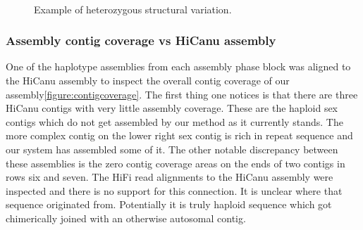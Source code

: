 {\begin{figure}[htbp!]
\caption{Example of heterozygous structural variation.}
\label{figure:assemblyplot}
\begin{centering}
 \\
\end{centering}
\end{figure}

\subsubsection{Assembly contig coverage vs HiCanu assembly}

\par{
One of the haplotype assemblies from each assembly phase block was aligned to the HiCanu assembly to inspect the overall contig coverage of our assembly\ref{figure:contigcoverage}. The first thing one notices is that there are three HiCanu contigs with very little assembly coverage. These are the haploid sex contigs which do not get assembled by our method as it currently stands. The more complex contig on the lower right sex contig is rich in repeat sequence and our system has assembled some of it. The other notable discrepancy between these assemblies is the zero contig coverage areas on the ends of two contigs in rows six and seven. The HiFi read alignments to the HiCanu assembly were inspected and there is no support for this connection. It is unclear where that sequence originated from. Potentially it is truly haploid sequence which got chimerically joined with an otherwise autosomal contig.
}

}

